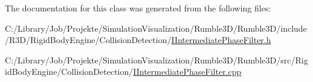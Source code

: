 The documentation for this class was generated from the following files\+:\begin{DoxyCompactItemize}
\item 
C\+:/\+Library/\+Job/\+Projekte/\+Simulation\+Visualization/\+Rumble3\+D/\+Rumble3\+D/include/\+R3\+D/\+Rigid\+Body\+Engine/\+Collision\+Detection/\mbox{\hyperlink{_i_intermediate_phase_filter_8h}{I\+Intermediate\+Phase\+Filter.\+h}}\item 
C\+:/\+Library/\+Job/\+Projekte/\+Simulation\+Visualization/\+Rumble3\+D/\+Rumble3\+D/src/\+Rigid\+Body\+Engine/\+Collision\+Detection/\mbox{\hyperlink{_i_intermediate_phase_filter_8cpp}{I\+Intermediate\+Phase\+Filter.\+cpp}}\end{DoxyCompactItemize}
